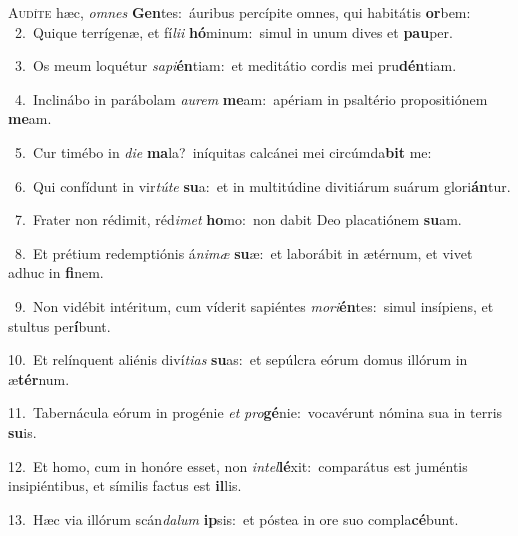 \lettrine{\initial\textcolor{\initialcolor}{A}}{udíte} hæc, \textit{om}\-\textit{nes} \textbf{Gen}\-tes:~\star áuribus percípite omnes, qui habitátis \textbf{or}\-bem:\\
{\numbfont\textcolor{\numbcolor}{~2.}}~Quique terrígenæ, et fí\-\textit{li}\-\textit{i} \textbf{hó}\-minum:~\star simul in unum dives et \textbf{pau}\-per.\par
{\numbfont\textcolor{\numbcolor}{~3.}}~Os meum loquétur \textit{sa}\-\textit{pi}\textbf{én}tiam:~\star et meditátio cordis mei pru\-\textbf{dén}\-tiam.\par
{\numbfont\textcolor{\numbcolor}{~4.}}~Inclinábo in parábolam \textit{au}\-\textit{rem} \textbf{me}\-am:~\star apériam in psaltério propositiónem \textbf{me}\-am.\par
{\numbfont\textcolor{\numbcolor}{~5.}}~Cur timébo in \textit{di}\-\textit{e} \textbf{ma}\-la?~\star iníquitas calcánei mei circúmda\textbf{bit} me:\par
{\numbfont\textcolor{\numbcolor}{~6.}}~Qui confídunt in vir\-\textit{tú}\-\textit{te} \textbf{su}\-a:~\star et in multitúdine divitiárum suárum glori\-\textbf{án}\-tur.\par
{\numbfont\textcolor{\numbcolor}{~7.}}~Frater non rédimit, réd\-\textit{i}\-\textit{met} \textbf{ho}\-mo:~\star non dabit Deo placatiónem \textbf{su}\-am.\par
{\numbfont\textcolor{\numbcolor}{~8.}}~Et prétium redemptiónis á\-\textit{ni}\-\textit{mæ} \textbf{su}\-æ:~\star et laborábit in ætérnum, et vivet adhuc in \textbf{fi}\-nem.\par
{\numbfont\textcolor{\numbcolor}{~9.}}~Non vidébit intéritum, cum víderit sapiéntes \textit{mo}\-\textit{ri}\textbf{én}tes:~\star simul insípiens, et stultus per\-\textbf{í}\-bunt.\par
{\numbfont\textcolor{\numbcolor}{10.}}~Et relínquent aliénis diví\-\textit{ti}\-\textit{as} \textbf{su}\-as:~\star et sepúlcra eórum domus illórum in æ\-\textbf{tér}\-num.\par
{\numbfont\textcolor{\numbcolor}{11.}}~Tabernácula eórum in progénie \textit{et} \textit{pro}\-\textbf{gé}nie:~\star vocavérunt nómina sua in terris \textbf{su}\-is.\par
{\numbfont\textcolor{\numbcolor}{12.}}~Et homo, cum in honóre esset, non \textit{in}\-\textit{tel}\textbf{lé}xit:~\star comparátus est juméntis insipiéntibus, et símilis factus est \textbf{il}\-lis.\par
{\numbfont\textcolor{\numbcolor}{13.}}~Hæc via illórum scán\-\textit{da}\-\textit{lum} \textbf{ip}\-sis:~\star et póstea in ore suo compla\-\textbf{cé}\-bunt.\par
